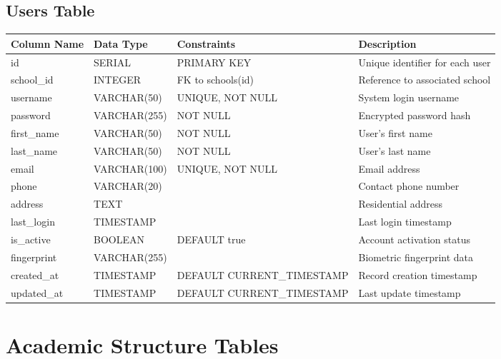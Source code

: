 \documentclass[11pt,a4paper]{article}
\begin{document}
\subsection{Users Table}
\begin{longtable}{|p{3.5cm}|p{2.5cm}|p{3cm}|p{5.5cm}|}
\hline
\textbf{Column Name} & \textbf{Data Type} & \textbf{Constraints} & \textbf{Description} \\
\hline
\endhead
id & SERIAL & PRIMARY KEY & Unique identifier for each user \\
\hline
school\_id & INTEGER & FK to schools(id) & Reference to associated school \\
\hline
username & VARCHAR(50) & UNIQUE, NOT NULL & System login username \\
\hline
password & VARCHAR(255) & NOT NULL & Encrypted password hash \\
\hline
first\_name & VARCHAR(50) & NOT NULL & User's first name \\
\hline
last\_name & VARCHAR(50) & NOT NULL & User's last name \\
\hline
email & VARCHAR(100) & UNIQUE, NOT NULL & Email address \\
\hline
phone & VARCHAR(20) & & Contact phone number \\
\hline
address & TEXT & & Residential address \\
\hline
last\_login & TIMESTAMP & & Last login timestamp \\
\hline
is\_active & BOOLEAN & DEFAULT true & Account activation status \\
\hline
fingerprint & VARCHAR(255) & & Biometric fingerprint data \\
\hline
created\_at & TIMESTAMP & DEFAULT CURRENT\_TIMESTAMP & Record creation timestamp \\
\hline
updated\_at & TIMESTAMP & DEFAULT CURRENT\_TIMESTAMP & Last update timestamp \\
\hline
\end{longtable}

\section{Academic Structure Tables}
\end{document}
